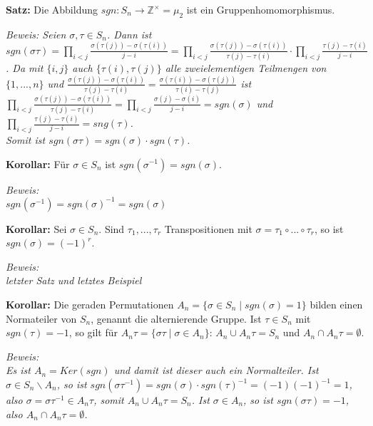 \documentclass[11pt]{article}
\begin{document}
		\begin{framed}
			\textbf{Satz:} Die Abbildung $sgn: S_n \to \mathbb Z^{\times}=\mu_2$ ist ein Gruppenhomomorphismus.
		\end{framed}
		\textit{Beweis: Seien $\sigma,\tau\in S_n$. Dann ist\\
		$sgn(\sigma\tau)=\prod\limits_{i<j} \frac{\sigma(\tau(j))-\sigma(\tau(i))}{j-i}=\prod\limits_{i<j} \frac{\sigma(\tau(j))-\sigma(
		\tau(i))}{\tau(j)-\tau(i)}\cdot \prod\limits_{i<j} \frac{\tau(j)-\tau(i)}{j-i}$. Da mit $\{i,j\}$ auch $\{\tau(i),\tau(j)\}$ alle 
		zweielementigen Teilmengen von $\{1,...,n\}$ und $\frac{\sigma(\tau(j))-\sigma(\tau(i))}{\tau(j)-\tau(i)}=\frac{\sigma(\tau(i))-
		\sigma(\tau(j))}{\tau(i)-\tau(j)}$ ist $\prod\limits_{i<j} \frac{\sigma(\tau(j))-\sigma(\tau(i))}{\tau(j)-\tau(i)}=\prod\limits_
		{i<j} \frac{\sigma(j)-\sigma(i)}{j-i}=sgn(\sigma)$ und $\prod\limits_{i<j} \frac{\tau(j)-\tau(i)}{j-i}=sng(\tau)$. \\
		Somit ist $sgn(\sigma\tau)=sgn(\sigma)\cdot sgn(\tau)$.}
		
		\begin{framed}
			\textbf{Korollar:} Für $\sigma\in S_n$ ist $sgn(\sigma^{-1})=sgn(\sigma)$.
		\end{framed}
		\textit{Beweis: \\
		$sgn(\sigma^{-1})=sgn(\sigma)^{-1}=sgn(\sigma)$}
		
		\begin{framed}
			\textbf{Korollar:} Sei $\sigma\in S_n$. Sind $\tau_1,...,\tau_r$ Transpositionen mit $\sigma=\tau_1\circ ... \circ \tau_r$, so ist 
			$sgn(\sigma)=(-1)^r$.
		\end{framed}
		\textit{Beweis: \\
		letzter Satz und letztes Beispiel}
		
		\begin{framed}
			\textbf{Korollar:} Die geraden Permutationen $A_n=\{\sigma \in S_n \mid sgn(\sigma)=1\}$ bilden einen Normateiler von $S_n$, 
			genannt die alternierende Gruppe. Ist $\tau\in S_n$ mit $sgn(\tau)=-1$, so gilt für $A_n\tau=\{\sigma\tau \mid \sigma\in A_n\}$: 
			$A_n \cup A_n\tau = S_n$ und $A_n \cap A_n\tau=\emptyset$.
		\end{framed}
		\textit{Beweis: \\
		Es ist $A_n=Ker(sgn)$ und damit ist dieser auch ein Normalteiler. Ist $\sigma\in S_n\backslash A_n$, so ist $sgn(\sigma\tau^{-1})=
		sgn(\sigma)\cdot sgn(\tau)^{-1}=(-1)(-1)^{-1}=1$, also $\sigma=\sigma\tau^{-1}\in A_n\tau$, somit $A_n\cup A_n\tau=S_n$. Ist 
		$\sigma\in A_n$, so ist $sgn(\sigma\tau)=-1$, also $A_n\cap A_n\tau=\emptyset$.}
		
\end{document}
